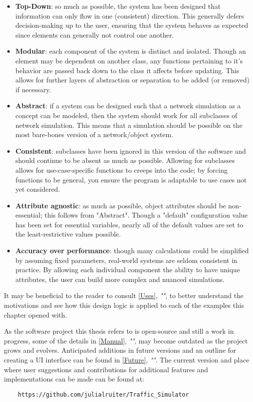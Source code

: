 \begin{itemize}
  \item \textbf{Top-Down}:  so much as possible, the system has been designed that information can only flow in one (consistent) direction.  This generally defers decision-making up to the user, ensuring that the system behaves as expected since elements can generally not control one another. 
  \item \textbf{Modular}:  each component of the system is distinct and isolated.  Though an element may be dependent on another class, any functions pertaining to it's behavior are passed back down to the class it affects before updating.  This allows for further layers of abstraction or separation to be added (or removed) if necessary.
  \item \textbf{Abstract}:  if a system can be designed such that a network simulation as a concept can be modeled, then the system should work for all subclasses of network simulation.  This means that a simulation should be possible on the most bare-bones version of a network/object system.
  \item  \textbf{Consistent}:  subclasses have been ignored in this version of the software and should continue to be absent as much as possible.  Allowing for subclasses allows for use-case-specific functions to creeps into the code; by forcing functions to be general, you ensure the program is adaptable to use cases not yet considered.
  \item \textbf{Attribute agnostic}:  as much as possible, object attributes should be non-essential; this follows from "Abstract".  Though a "default" configuration value has been set for essential variables, nearly all of the default values are set to the least-restrictive values possible.
  \item \textbf{Accuracy over performance}:  though many calculations could be simplified by assuming fixed parameters, real-world systems are seldom consistent in practice.  By allowing each individual component the ability to have unique attributes, the user can build more complex and nuanced simulations.
\end{itemize}

It may be beneficial to the reader to consult \autoref{Uses}, \textit{""}, to better understand the motivations and see how this design logic is applied to each of the examples this chapter opened with.  \\

\par As the software project this thesis refers to is open-source and still a work in progress, some of the details in \autoref{Manual}, \textit{""}, may become outdated as the project grows and evolves.  Anticipated additions in future versions and an outline for creating a UI interface can be found in \autoref{Future}, \textit{""}.  The current version and place where user suggestions and contributions for additional features and implementations can be made can be found at:  
\begin{verbatim}
    https://github.com/julialruiter/Traffic_Simulator
\end{verbatim}

